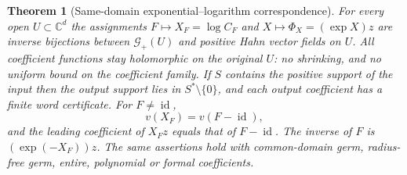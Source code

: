 \documentclass[11pt,letterpaper]{article}
\newtheorem{theorem}{Theorem}[section]
\theoremstyle{definition}
\theoremstyle{remark}
\newcommand{\C}{\mathbb C}
\newcommand{\GG}{\mathscr G}
\newcommand{\id}{\operatorname{id}}
\numberwithin{equation}{section}
\begin{document}
\begin{theorem}[Same-domain exponential--logarithm correspondence]
\label{dyn:thm:exp-log}
For every open $U\subset\C^{d}$ the assignments
$F\mapsto X_F=\log C_F$ and $X\mapsto\Phi_X=(\exp X)z$ are inverse
bijections between $\GG_+(U)$ and positive Hahn vector fields on $U$. All
coefficient functions stay holomorphic on the \emph{original} $U$: no
shrinking, and no uniform bound on the coefficient family. If $S$ contains
the positive support of the input then the output support lies in
$S^{*}\setminus\{0\}$, and each output coefficient has a finite word
certificate. For $F\ne\id$,
\begin{equation}\label{dyn:eq:valXF}
 v(X_F)=v(F-\id),
\end{equation}
and the leading coefficient of $X_Fz$ equals that of $F-\id$. The inverse
of $F$ is $(\exp(-X_F))z$. The same assertions hold with common-domain
germ, radius-free germ, entire, polynomial or formal coefficients.
\end{theorem}
\end{document}
